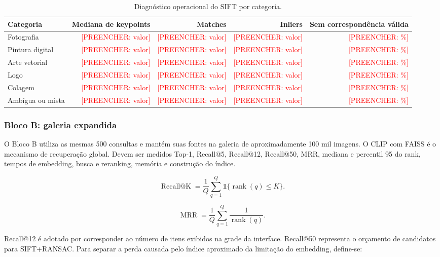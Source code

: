 \documentclass[12pt]{article}
\newcommand{\todo}[1]{\textcolor{red}{[PREENCHER: #1]}}
\newcommand{\clip}{CLIP}
\newcommand{\faiss}{FAISS}
\begin{document}
\begin{table}[H]
\centering
\caption{Diagnóstico operacional do SIFT por categoria.}
\label{tab:sift-diagnostico}
\begin{tabularx}{\linewidth}{Y r r r r}
\toprule
\textbf{Categoria} & \textbf{Mediana de keypoints} & \textbf{Matches} &
\textbf{Inliers} & \textbf{Sem correspondência válida}\\
\midrule
Fotografia & \todo{valor} & \todo{valor} & \todo{valor} & \todo{\%}\\
Pintura digital & \todo{valor} & \todo{valor} & \todo{valor} & \todo{\%}\\
Arte vetorial & \todo{valor} & \todo{valor} & \todo{valor} & \todo{\%}\\
Logo & \todo{valor} & \todo{valor} & \todo{valor} & \todo{\%}\\
Colagem & \todo{valor} & \todo{valor} & \todo{valor} & \todo{\%}\\
Ambígua ou mista & \todo{valor} & \todo{valor} & \todo{valor} & \todo{\%}\\
\bottomrule
\end{tabularx}
\end{table}

\subsubsection{Bloco B: galeria expandida}

O Bloco B utiliza as mesmas 500 consultas e mantém suas fontes na galeria de
aproximadamente 100 mil imagens. O \clip{} com \faiss{} é o mecanismo de
recuperação global. Devem ser medidos Top-1, Recall@5, Recall@12, Recall@50,
MRR, mediana e percentil 95 do rank, tempos de embedding, busca e reranking,
memória e construção do índice.

\begin{equation}
\operatorname{Recall@K}=
\frac{1}{Q}\sum_{q=1}^{Q}
\mathbb{1}\{\operatorname{rank}(q)\leq K\}.
\label{eq:recall}
\end{equation}

\begin{equation}
\operatorname{MRR}=
\frac{1}{Q}\sum_{q=1}^{Q}\frac{1}{\operatorname{rank}(q)}.
\label{eq:mrr}
\end{equation}

Recall@12 é adotado por corresponder ao número de itens exibidos na grade da
interface. Recall@50 representa o orçamento de candidatos para SIFT+RANSAC.
Para separar a perda causada pelo índice aproximado da limitação do embedding,
define-se:
\end{document}
